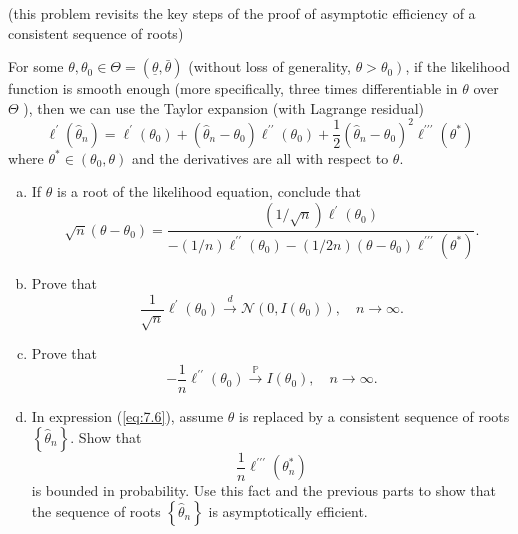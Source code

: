 \begin{ex}
    (this problem revisits the key steps of the proof of asymptotic efficiency of a consistent sequence of roots)

    For some \(\theta, \theta_{0} \in \Theta=(\underline{\theta}, \bar{\theta})\) (without loss of generality, \(\left.\theta>\theta_{0}\right)\), if the likelihood function is smooth enough (more specifically, three times differentiable in \(\theta\) over \(\Theta\) ), then we can use the Taylor expansion (with Lagrange residual)
    \begin{equation}
        \label{eq:7.6}
        \ell^{\prime}(\hat{\theta}_n)=\ell^{\prime}\left(\theta_{0}\right)+\left(\widehat{\theta}_{n}-\theta_{0}\right) \ell^{\prime \prime}\left(\theta_{0}\right)+\frac{1}{2}\left(\widehat{\theta}_{n}-\theta_{0}\right)^{2} \ell^{\prime \prime \prime}\left(\theta^{*}\right)
    \end{equation}
    where \(\theta^{*} \in\left(\theta_{0}, \theta\right)\) and the derivatives are all with respect to \(\theta\). 
    \begin{enumerate}[(a)]
        \item If \(\theta\) is a root of the likelihood equation, conclude that
        \[
            \sqrt{n}\left(\theta-\theta_{0}\right)=\frac{(1 / \sqrt{n}) \ell^{\prime}(\theta_0)}{-(1 / n) \ell^{\prime \prime}\left(\theta_{0}\right)-(1 / 2 n)\left(\theta-\theta_{0}\right) \ell^{\prime \prime \prime}\left(\theta^{*}\right)}. 
        \]
        \item  Prove that
        \[
            \frac{1}{\sqrt{n}} \ell^{\prime}\left(\theta_{0}\right) \stackrel{d}{\rightarrow} \mathcal{N}\left(0, I\left(\theta_{0}\right)\right), \quad n \rightarrow \infty. 
        \]
        \item Prove that
        \[
            -\frac{1}{n} \ell^{\prime \prime}\left(\theta_{0}\right) \stackrel{\mathbb{P}}{\rightarrow} I\left(\theta_{0}\right), \quad n \rightarrow \infty. 
        \]
        \item In expression (\ref{eq:7.6}), assume \(\theta\) is replaced by a consistent sequence of roots \(\left\{\hat{\theta}_{n}\right\}\). Show that
        \[
        \frac{1}{n} \ell^{\prime \prime \prime}\left(\theta_{n}^{*}\right)
        \]
        is bounded in probability. Use this fact and the previous parts to show that the sequence of roots \(\left\{\widehat{\theta}_{n}\right\}\) is asymptotically efficient. 
    \end{enumerate}
\end{ex}


